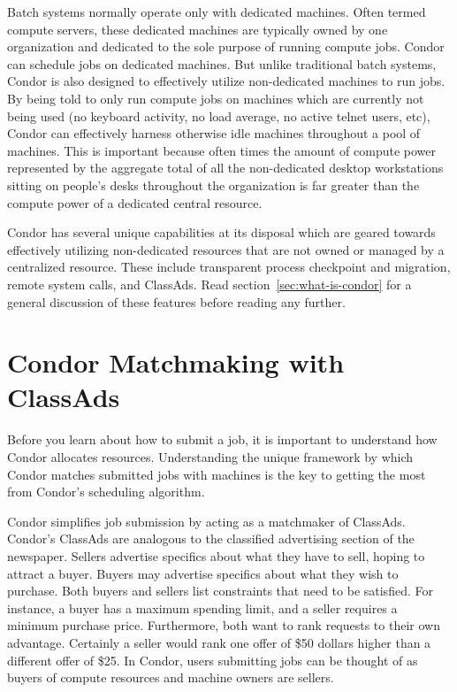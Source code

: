 Batch systems normally operate only with dedicated machines.  Often 
termed compute servers, these dedicated machines are typically owned by
one organization and dedicated to the sole purpose of running compute
jobs.  Condor can schedule jobs on dedicated machines.  But unlike traditional 
batch systems, Condor is also designed to effectively 
utilize non-dedicated machines to run jobs.  By being told to only
run compute jobs on machines which are currently not being used (no keyboard
activity, no load average, no active telnet users, etc), Condor can
effectively harness otherwise idle machines throughout a pool of machines.
This is important because often times the amount of
compute power represented by the aggregate total of all the non-dedicated 
desktop workstations sitting on people's desks throughout the
organization is far greater than the compute power of a dedicated
central resource.

Condor has several unique capabilities at its disposal which are geared 
towards effectively utilizing non-dedicated resources that are not owned or
managed by a centralized resource. These include transparent process
checkpoint and migration, remote system calls, and ClassAds.
Read section~\ref{sec:what-is-condor} for a general 
discussion of these features before reading any further.


\section{Condor Matchmaking with ClassAds}

Before you learn about how to submit a job, it is important to
understand how Condor allocates resources. 
Understanding the
unique framework by which Condor matches submitted jobs with machines is
the key to getting the most from Condor's scheduling algorithm. 

Condor simplifies job submission by acting as a matchmaker of ClassAds.
Condor's ClassAds
are analogous to the classified advertising section of the
newspaper. Sellers advertise specifics about what they have to sell,
hoping to attract a buyer. Buyers may advertise specifics about what
they wish to purchase. Both buyers and sellers list constraints that
need to be satisfied.
For instance, a buyer has a maximum spending limit, 
and a seller requires a minimum purchase price.
Furthermore, both want to rank requests to their own advantage.
Certainly a seller would rank
one offer of \$50 dollars higher than a different
offer of \$25.
In Condor, users submitting
jobs can be thought of as buyers of compute resources and machine owners
are sellers. 

